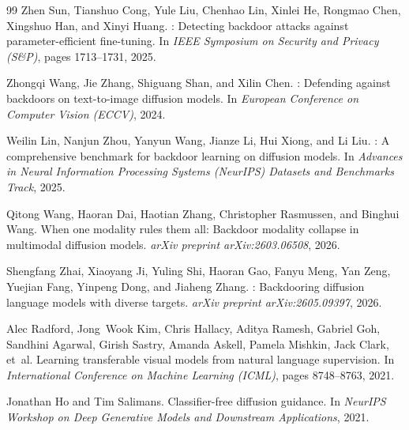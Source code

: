 \documentclass[10pt,twocolumn,letterpaper]{article}
\begin{document}
\begin{thebibliography}{99}
Zhen Sun, Tianshuo Cong, Yule Liu, Chenhao Lin, Xinlei He, Rongmao Chen, Xingshuo Han, and Xinyi Huang.
: Detecting backdoor attacks against parameter-efficient fine-tuning.
\newblock In \emph{IEEE Symposium on Security and Privacy (S\&P)}, pages 1713--1731, 2025.

Zhongqi Wang, Jie Zhang, Shiguang Shan, and Xilin Chen.
: Defending against backdoors on text-to-image diffusion models.
\newblock In \emph{European Conference on Computer Vision (ECCV)}, 2024.

Weilin Lin, Nanjun Zhou, Yanyun Wang, Jianze Li, Hui Xiong, and Li Liu.
: A comprehensive benchmark for backdoor learning on diffusion models.
\newblock In \emph{Advances in Neural Information Processing Systems (NeurIPS) Datasets and Benchmarks Track}, 2025.

Qitong Wang, Haoran Dai, Haotian Zhang, Christopher Rasmussen, and Binghui Wang.
\newblock When one modality rules them all: Backdoor modality collapse in multimodal diffusion models.
\newblock \emph{arXiv preprint arXiv:2603.06508}, 2026.

Shengfang Zhai, Xiaoyang Ji, Yuling Shi, Haoran Gao, Fanyu Meng, Yan Zeng, Yuejian Fang, Yinpeng Dong, and Jiaheng Zhang.
: Backdooring diffusion language models with diverse targets.
\newblock \emph{arXiv preprint arXiv:2605.09397}, 2026.

Alec Radford, Jong~Wook Kim, Chris Hallacy, Aditya Ramesh, Gabriel Goh, Sandhini Agarwal, Girish Sastry, Amanda Askell, Pamela Mishkin, Jack Clark, et~al.
\newblock Learning transferable visual models from natural language supervision.
\newblock In \emph{International Conference on Machine Learning (ICML)}, pages 8748--8763, 2021.

Jonathan Ho and Tim Salimans.
\newblock Classifier-free diffusion guidance.
\newblock In \emph{NeurIPS Workshop on Deep Generative Models and Downstream Applications}, 2021.

\end{thebibliography}
\end{document}
